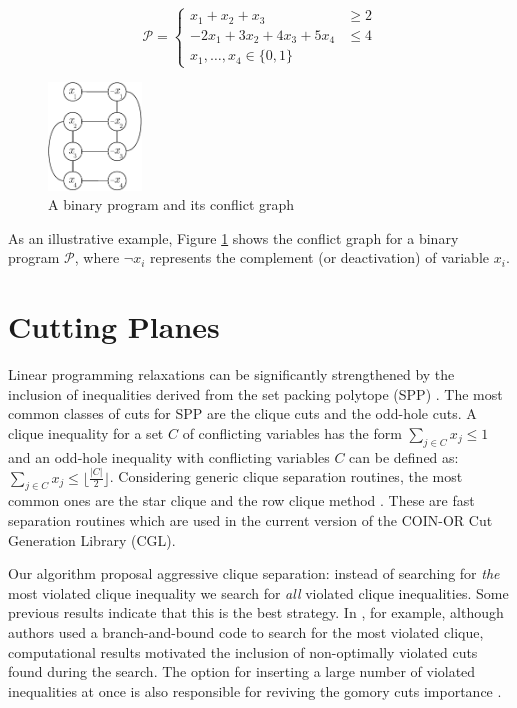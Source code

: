 \documentclass{endm}
\begin{document}
\begin{figure}
\begin{minipage}[b]{.5\textwidth}
\[
\mathcal{P} = \left\{
\begin{array}{lr}
x_1+x_2+x_3 & \geq 2 \\
-2x_{1}+3x_{2}+4x_{3}+5x_{4} & \leq 4 \\
x_{1},\ldots,x_{4}\in\{0,1\}
\end{array}
\right.
\]
\end{minipage}
\begin{minipage}{.5\textwidth}
	\centering
	\includegraphics[width=2.5cm]{cGraph.pdf}
\end{minipage}
\caption{A binary program and its conflict graph}\label{graph}
\end{figure}

As an illustrative example, Figure \ref{graph} shows the conflict graph for a binary program $\mathcal{P}$, where $\neg x_i$ represents the complement (or deactivation) of variable $x_i$.  

\section{Cutting Planes}\label{cut}

Linear programming relaxations can be significantly strengthened by the inclusion of inequalities derived from the set packing polytope (SPP) \cite {Padberg1973}. The most common classes of cuts for SPP are the clique cuts and the odd-hole cuts. A clique inequality for a set $C$ of conflicting variables has the form $\sum_{j\in C}x_{j} \leq 1$ and an odd-hole inequality with conflicting variables $C$ can be defined as: $\sum_{j\in C}x_{j} \leq \lfloor \frac{|C|}{2}\rfloor$. Considering generic clique separation routines, the most common ones are the star clique and the row clique method \cite{Borndorfer1998}. These are fast separation routines which are used in the current version of the COIN-OR\cite{LougeeHeimer2003} Cut Generation Library (CGL).  

Our algorithm proposal aggressive clique separation: instead of searching for \emph{the} most violated clique inequality we search for \emph{all} violated clique inequalities. Some previous results indicate that this is the best strategy. In \cite{Marecek2012}, for example, although authors used a branch-and-bound code to search for the most violated clique, computational results motivated the inclusion of non-optimally violated cuts found during the search. The option for inserting a large number of violated inequalities at once is also responsible for reviving the gomory cuts importance \cite {Cornuejols2007}.
\end{document}
